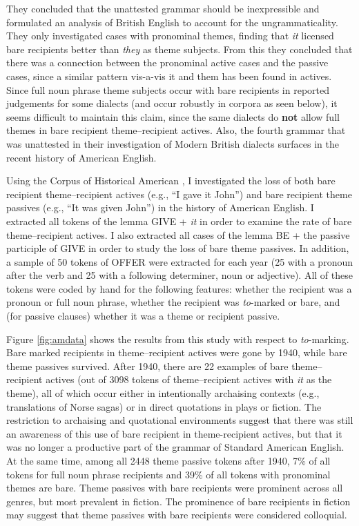 They concluded that the unattested grammar should be inexpressible and formulated an analysis of British English to account for the ungrammaticality. They only investigated cases with pronominal themes, finding that \textit{it} licensed bare recipients better than \textit{they} as theme subjects. From this they concluded that there was a connection between the pronominal active cases and the passive cases, since a similar pattern vis-a-vis it and them has been found in actives. Since full noun phrase theme subjects occur with bare recipients in reported judgements for some dialects (and occur robustly in corpora as seen below), it seems difficult to maintain this claim, since the same dialects do \textbf{not} allow full themes in bare recipient theme--recipient actives. Also, the fourth grammar that was unattested in their investigation of Modern British dialects surfaces in the recent history of American English.

Using the Corpus of Historical American \citep{Davies.2010}, I investigated the loss of both bare recipient theme--recipient actives (e.g., ``I gave it John'') and bare recipient theme passives (e.g., ``It was given John'') in the history of American English. I extracted all tokens of the lemma GIVE + \textit{it} in order to examine the rate of bare theme--recipient actives. I also extracted all cases of the lemma BE + the passive participle of GIVE in order to study the loss of bare theme passives. In addition, a sample of 50 tokens of OFFER were extracted for each year (25 with a pronoun after the verb and 25 with a following determiner, noun or adjective). All of these tokens were coded by hand for the following features: whether the recipient was a pronoun or full noun phrase, whether the recipient was \textit{to}-marked or bare, and (for passive clauses) whether it was a theme or recipient passive.

Figure \ref{fig:amdata} shows the results from this study with respect to \textit{to}-marking. Bare marked recipients in theme--recipient actives were gone by 1940, while bare theme passives survived. After 1940, there are 22 examples of bare theme--recipient actives (out of 3098 tokens of theme--recipient actives with \textit{it} as the theme), all of which occur either in intentionally archaising contexts (e.g., translations of Norse sagas) or in direct quotations in plays or fiction. The restriction to archaising and quotational environments suggest that there was still an awareness of this use of bare recipient in theme-recipient actives, but that it was no longer a productive part of the grammar of Standard American English. At the same time, among all 2448 theme passive tokens after 1940, 7\% of all tokens for full noun phrase recipients and 39\% of all tokens with pronominal themes are bare. Theme passives with bare recipients were prominent across all genres, but most prevalent in fiction. The prominence of bare recipients in fiction may suggest that theme passives with bare recipients were considered colloquial.

